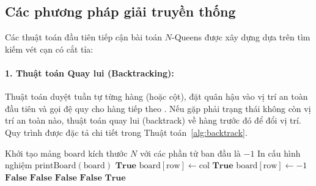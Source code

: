 \documentclass[a4paper,fleqn]{cas-sc}
\begin{document}
\subsection{Các phương pháp giải truyền thống}
\label{subsec:traditional}
Các thuật toán đầu tiên tiếp cận bài toán $N$-Queens được xây dựng dựa trên tìm kiếm vét cạn có cắt tỉa:

\paragraph{1. Thuật toán Quay lui (Backtracking):}
Thuật toán duyệt tuần tự từng hàng (hoặc cột), đặt quân hậu vào vị trí an toàn đầu tiên và gọi đệ quy cho hàng tiếp theo \cite{golomb1965backtrack}. Nếu gặp phải trạng thái không còn vị trí an toàn nào, thuật toán quay lui (backtrack) về hàng trước đó để đổi vị trí. Quy trình được đặc tả chi tiết trong Thuật toán~\ref{alg:backtrack}.

\begin{algorithm}[htbp]
\caption{Giải bài toán $N$-Queens bằng thuật toán Quay lui (Backtracking)}
\label{alg:backtrack}
\begin{algorithmic}[1]
    \State Khởi tạo mảng $\text{board}$ kích thước $N$ với các phần tử ban đầu là $-1$
    \State {}
\EndFunction
\Statex
{}
        \State In cấu hình nghiệm $\text{printBoard}(\text{board})$
        \State \Return $\mathbf{True}$
    \EndIf
            \State $\text{board}[\text{row}] \gets \text{col}$ 
                \State \Return $\mathbf{True}$
            \EndIf
            \State $\text{board}[\text{row}] \gets -1$ 
        \EndIf
    \EndFor
    \State \Return $\mathbf{False}$
\EndFunction
\Statex
{}
         \Return $\mathbf{False}$ 
        \EndIf
         \Return $\mathbf{False}$ 
        \EndIf
         \Return $\mathbf{False}$ 
        \EndIf
    \EndFor
    \State \Return $\mathbf{True}$
\EndFunction
\end{algorithmic}
\end{algorithm}
\end{document}
